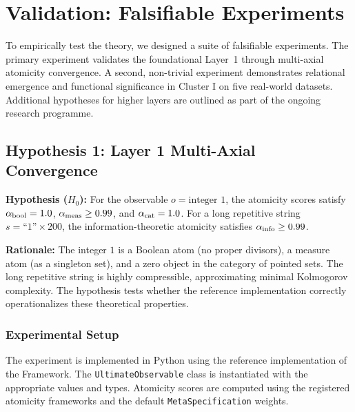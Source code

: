 \section{Validation: Falsifiable Experiments}
\label{sec:validation}

To empirically test the theory, we designed a suite of falsifiable experiments. The primary experiment validates the foundational Layer~1 through multi-axial atomicity convergence. A second, non-trivial experiment demonstrates relational emergence and functional significance in Cluster I on five real-world datasets. Additional hypotheses for higher layers are outlined as part of the ongoing research programme.

\subsection{Hypothesis 1: Layer 1 Multi-Axial Convergence}
\label{subsec:validation-h1}

\textbf{Hypothesis ($H_0$):} For the observable $o = \text{integer } 1$, the atomicity scores satisfy $\alpha_{\text{bool}} = 1.0$, $\alpha_{\text{meas}} \ge 0.99$, and $\alpha_{\text{cat}} = 1.0$. For a long repetitive string $s = \text{``1''} \times 200$, the information-theoretic atomicity satisfies $\alpha_{\text{info}} \ge 0.99$.

\textbf{Rationale:} The integer $1$ is a Boolean atom (no proper divisors), a measure atom (as a singleton set), and a zero object in the category of pointed sets. The long repetitive string is highly compressible, approximating minimal Kolmogorov complexity. The hypothesis tests whether the reference implementation correctly operationalizes these theoretical properties.

\subsubsection{Experimental Setup}
The experiment is implemented in Python using the reference implementation of the \Apeiron{} Framework. The \texttt{UltimateObservable} class is instantiated with the appropriate values and types. Atomicity scores are computed using the registered atomicity frameworks and the default \texttt{MetaSpecification} weights.

